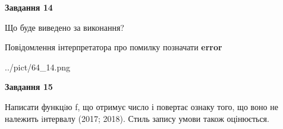 \documentclass[11pt, ukrainian]{article}
\begin{document}
{\begin {large}
{\begin {center}\textbf{Завдання 14}\end {center}}\par
Що буде виведено за виконання? \par
Повідомлення інтерпретатора про помилку позначати \textbf{error}

\begin{center}
	{../pict/64_14.png}
\end{center}
\newpage

{\begin {center}\textbf{Завдання 15}\end {center}}\par

Написати функцiю f, що отримує число і повертає ознаку того, що воно не належить iнтервалу (2017; 2018). Стиль запису умови також оцінюється.\par
\newpage

\end {large}}
\end{document}
